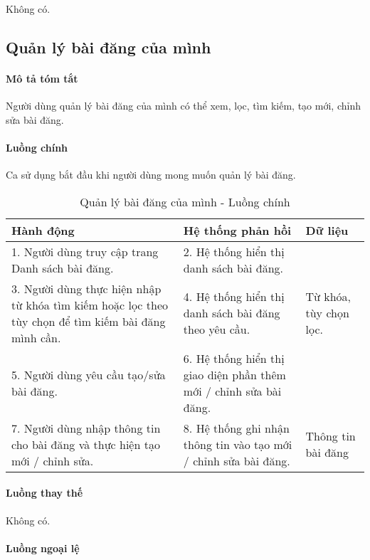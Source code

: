 \documentclass[./../main.tex]{subfiles}
\begin{document}
Không có.

\subsection{Quản lý bài đăng của mình}

\paragraph*{Mô tả tóm tắt}

Người dùng quản lý bài đăng của mình có thể xem, lọc, tìm kiếm, tạo mới, chỉnh sửa bài đăng.

\paragraph*{Luồng chính} Ca sử dụng bắt đầu khi người dùng mong muốn quản lý bài đăng.

\begin{table}[H]
  \caption{Quản lý bài đăng của mình - Luồng chính}
  \label{tab:partner_manage_posts}
  \begin{tabularx}{\textwidth}{|X|X|X|}
    \hline
\textbf{Hành động} & \textbf{Hệ thống phản hồi} & \textbf{Dữ liệu} \\ \hline
1. Người dùng truy cập trang Danh sách bài đăng. & 2. Hệ thống hiển thị danh sách bài đăng. &  \\ \hline
3. Người dùng thực hiện nhập từ khóa tìm kiếm hoặc lọc theo tùy chọn để tìm kiếm bài đăng mình cần. & 4. Hệ thống hiển thị danh sách bài đăng theo yêu cầu. & Từ khóa, tùy chọn lọc. \\ \hline
5. Người dùng yêu cầu tạo/sửa bài đăng. & 6. Hệ thống hiển thị giao diện phần thêm mới / chỉnh sửa bài đăng. &  \\ \hline
7. Người dùng nhập thông tin cho bài đăng và thực hiện tạo mới / chỉnh sửa. & 8. Hệ thống ghi nhận thông tin vào tạo mới / chỉnh sửa bài đăng. & Thông tin bài đăng \\ \hline
  \end{tabularx}
\end{table}

\paragraph*{Luồng thay thế} Không có.

\paragraph*{Luồng ngoại lệ}
\end{document}
